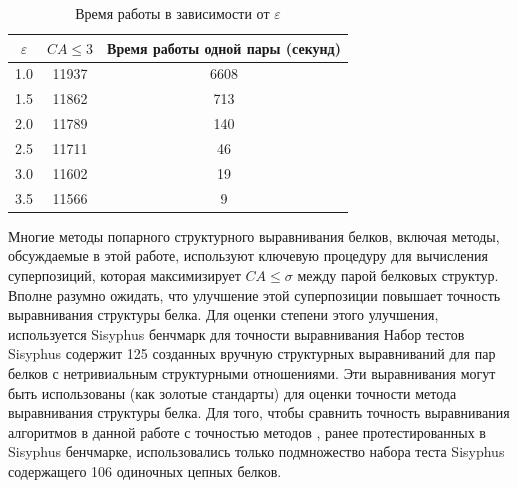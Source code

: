 \documentclass[a4paper]{extreport}
\newcommand{\eps}{\varepsilon}
\begin{document}
\begin{table}
\caption{ Время работы в зависимости от $\eps$}
\begin{center}
\begin{tabular}{|c|c|c|}
\hline
$\eps$ & $CA \leq 3$  & Время работы одной пары (секунд)\\
\hline
1.0 & 11937 & 6608\\
1.5 & 11862 & 713\\
2.0 & 11789 & 140\\
2.5 & 11711 & 46\\
3.0 & 11602 & 19\\
3.5 & 11566 & 9\\
\hline
\end{tabular}
\end{center}
\end{table}

Многие методы попарного структурного выравнивания белков, включая методы, обсуждаемые в этой работе, используют ключевую процедуру для вычисления суперпозиций, которая максимизирует $CA \leq \sigma$ между парой белковых структур. Вполне разумно ожидать, что улучшение этой суперпозиции повышает точность выравнивания структуры белка. Для оценки степени этого улучшения, используется Sisyphus бенчмарк для точности выравнивания Набор тестов Sisyphus содержит 125 созданных вручную структурных выравниваний для пар белков с нетривиальным структурными отношениями. Эти выравнивания могут быть использованы (как золотые стандарты) для оценки точности метода выравнивания структуры белка. Для того, чтобы сравнить точность выравнивания алгоритмов в данной работе с точностью методов , ранее протестированных в Sisyphus бенчмарке, использовались только подмножество набора теста Sisyphus содержащего 106 одиночных цепных белков.
\end{document}
